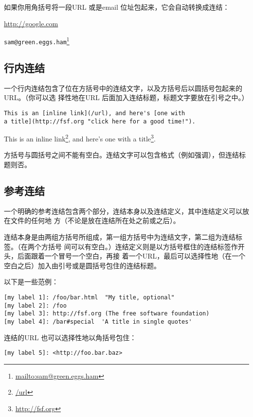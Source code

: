 \documentclass[fancyhdr,bookmark]{ctexbook}
\renewcommand{\href}[2]{#2\footnote{\url{#1}}}
\begin{document}
如果你用角括号将一段URL 或是email 位址包起来，它会自动转换成连结：

\url{http://google.com}

\href{mailto:sam@green.eggs.ham}{\nolinkurl{sam@green.eggs.ham}}

\hypertarget{ux884cux5185ux8fdeux7ed3}{%
\subsection{行内连结}\label{ux884cux5185ux8fdeux7ed3}}

一个行内连结包含了位在方括号中的连结文字，以及方括号后以圆括号包起来的URL。（你可以选
择性地在URL 后面加入连结标题，标题文字要放在引号之中。）

\begin{lstlisting}
This is an [inline link](/url), and here's [one with
a title](http://fsf.org "click here for a good time!").
\end{lstlisting}

This is an \href{/url}{inline link}, and here's
\href{http://fsf.org}{one with a title}.

方括号与圆括号之间不能有空白。连结文字可以包含格式（例如强调），但连结标题则否。

\hypertarget{ux53c2ux8003ux8fdeux7ed3}{%
\subsection{参考连结}\label{ux53c2ux8003ux8fdeux7ed3}}

一个明确的参考连结包含两个部分，连结本身以及连结定义，其中连结定义可以放在文件的任何地
方（不论是放在连结所在处之前或之后）。

连结本身是由两组方括号所组成，第一组方括号中为连结文字，第二组为连结标签。（在两个方括号
间可以有空白。）连结定义则是以方括号框住的连结标签作开头，后面跟着一个冒号一个空白，再接
着一个URL，最后可以选择性地（在一个空白之后）加入由引号或是圆括号包住的连结标题。

以下是一些范例：

\begin{lstlisting}
[my label 1]: /foo/bar.html  "My title, optional"
[my label 2]: /foo
[my label 3]: http://fsf.org (The free software foundation)
[my label 4]: /bar#special  'A title in single quotes'
\end{lstlisting}

连结的URL 也可以选择性地以角括号包住：

\begin{lstlisting}
[my label 5]: <http://foo.bar.baz>
\end{lstlisting}
\end{document}
